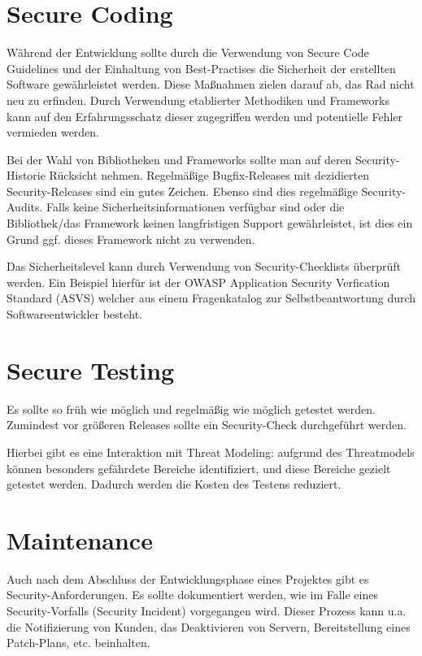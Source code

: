 \section{Secure Coding}

Während der Entwicklung sollte durch die Verwendung von Secure Code Guidelines und der Einhaltung von Best-Practises die Sicherheit der erstellten Software gewährleistet werden. Diese Maßnahmen zielen darauf ab, das Rad nicht neu zu erfinden. Durch Verwendung etablierter Methodiken und Frameworks kann auf den Erfahrungsschatz dieser zugegriffen werden und potentielle Fehler vermieden werden.

Bei der Wahl von Bibliotheken und Frameworks sollte man auf deren Security-Historie Rücksicht nehmen. Regelmäßige Bugfix-Releases mit dezidierten Security-Releases sind ein gutes Zeichen. Ebenso sind dies regelmäßige Security-Audits. Falls keine Sicherheitsinformationen verfügbar sind oder die Bibliothek/das Framework keinen langfristigen Support gewährleistet, ist dies ein Grund ggf. dieses Framework nicht zu verwenden.

Das Sicherheitslevel kann durch Verwendung von Security-Checklists überprüft werden. Ein Beispiel hierfür ist der OWASP Application Security Verfication Standard (ASVS) welcher aus einem Fragenkatalog zur Selbstbeantwortung durch Softwareentwickler besteht.

\section{Secure Testing}

Es sollte so früh wie möglich und regelmäßig wie möglich getestet werden. Zumindest vor größeren Releases sollte ein Security-Check durchgeführt werden.

Hierbei gibt es eine Interaktion mit Threat Modeling: aufgrund des Threatmodels können besonders gefährdete Bereiche identifiziert, und diese Bereiche gezielt getestet werden. Dadurch werden die Kosten des Testens reduziert.

\section{Maintenance}

Auch nach dem Abschluss der Entwicklungsphase eines Projektes gibt es Security-Anforderungen. Es sollte dokumentiert werden, wie im Falle eines Security-Vorfalls (Security Incident) vorgegangen wird. Dieser Prozess kann u.a. die Notifizierung von Kunden, das Deaktivieren von Servern, Bereitstellung eines Patch-Plans, etc. beinhalten.

